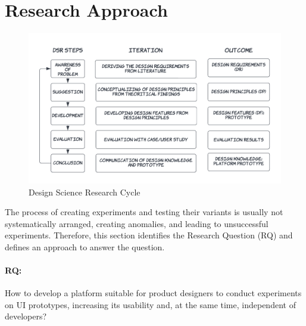 \section{Research Approach}
\label{intro:section:research}
\begin{figure}[ht]
    \centering
    \includegraphics[scale=0.2]{images/solution-ideas/DSRcycle.png}
    \caption{Design Science Research Cycle \cite{paper:designprinciple:vk}}
    \label{intro:fig:dps}
\end{figure}
The process of creating experiments and testing their variants is usually not systematically arranged, creating anomalies, and leading to unsuccessful experiments.
Therefore, this section identifies the Research Question (RQ) and defines an approach to answer the question.

\paragraph{RQ:}How to develop a platform suitable for product designers to conduct experiments on UI prototypes, increasing its usability and, at the same time, independent of developers?

